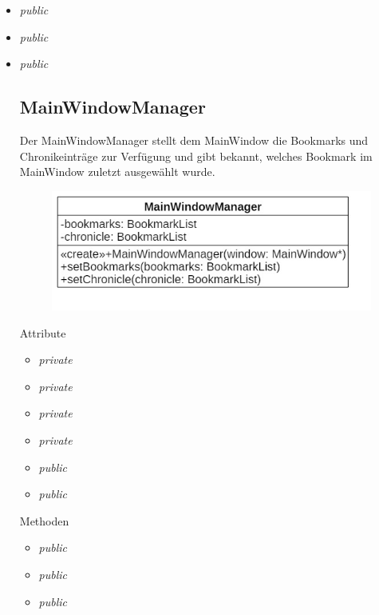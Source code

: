 \begin{itemize}
\begin{itemize}
	\item\textit{public }
	
	\item\textit{public }
	
	\item\textit{public }

\subsection*{MainWindowManager}
Der MainWindowManager stellt dem MainWindow die Bookmarks und Chronikeinträge zur Verfügung und gibt bekannt, welches Bookmark im MainWindow zuletzt ausgewählt wurde.

\begin{figure}[H]
\centering
\includegraphics[scale=0.5]{img/Klassendiagramm/Klassen/Controller/MainWindowManager}
\label{fig:mainWindowManager}
\end{figure}

Attribute
\begin{itemize}
	\item\textit{private }
	
	\item\textit{private }
	
	\item\textit{private }
	
	\item\textit{private }
	
	\item\textit{public }  
	
	\item\textit{public }
	
\end{itemize}

Methoden
\begin{itemize}
	\item\textit{public }
	
	\item\textit{public }
	
	\item\textit{public }
	

\end{itemize}
\end{itemize}
\end{itemize}
